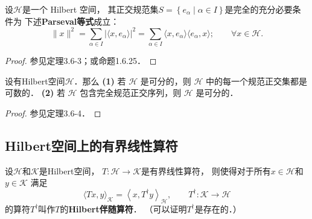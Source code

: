 \begin{theorem}
	设$\mathcal{H}$是一个 Hilbert 空间，
	其正交规范集$S=\left\{e_\alpha \mid \alpha \in I\right\}$是完全的充分必要条件为
    下述{\heiti \bfseries Parseval等式}成立：		
	\begin{equation}\label{chhs:eqn_Parseval}
		\|x\|^2=\sum_{\alpha \in I}\left| \langle x, e_\alpha \rangle \right|^2
		= \sum_{\alpha \in I} \langle x, e_\alpha \rangle \langle e_\alpha,x \rangle;
		\qquad \forall x \in \mathcal{H}. 
	\end{equation}
\end{theorem}
\begin{proof}
	参见\parencite{Kreyszig-1991}定理3.6-3；或\parencite{zhang-lin-2021}命题1.6.25．
\end{proof}



\begin{theorem}
	设有Hilbert空间$\mathcal{H}$．那么
	{\bfseries (1)} 若 $\mathcal{H}$ 是可分的，则 $\mathcal{H}$ 中的每一个规范正交集都是可数的．
	{\bfseries (2)} 若 $\mathcal{H}$ 包含完全规范正交序列，则 $\mathcal{H}$ 是可分的．
\end{theorem}
\begin{proof}
	参见\parencite{Kreyszig-1991}定理3.6-4．
\end{proof}



\subsection{Hilbert空间上的有界线性算符}


\begin{definition}\label{chhs:def_adjoint}
	设$\mathcal{H}$和$\mathcal{K}$是Hilbert空间，
	$T: \mathcal{H} \longrightarrow \mathcal{K}$是有界线性算符，
	则使得对于所有$x \in \mathcal{H}$和$y \in \mathcal{K}$ 满足
	\begin{equation}\label{chhs:eqn_adjoint}
		\langle T x, y\rangle_{\mathcal{K}} = \left\langle x, T^{\dagger} y\right\rangle_{\mathcal{H}} ,
		\qquad T^{\dagger}: \mathcal{K} \longrightarrow \mathcal{H}
	\end{equation}
	的算符$T^{\dagger}$叫作$T$的{\heiti \bfseries Hilbert伴随算符}． 
	（可以证明$T^{\dagger}$是存在的．）
\end{definition}





